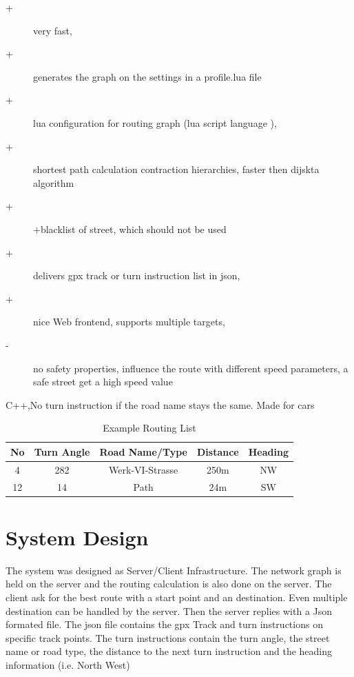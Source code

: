 \documentclass{sig-alternate}
\begin{document}
\begin{description}
\item[+]very fast, 
\item[+]generates the graph on the settings in a profile.lua file
\item[+]lua configuration for routing graph (lua script language ), 
\item[+]shortest path calculation contraction hierarchies, faster then dijskta algorithm
\item[+]+blacklist of street, which should not be used
\item[+]delivers gpx track or turn instruction list in json,
\item[+]nice Web frontend, supports multiple targets,
\item[-] no safety properties, influence the route with different speed parameters, a safe street get a high speed value
\end{description}

C++,No turn instruction if the road name stays the same. Made for cars


\begin{table}
\centering
\caption{Example Routing List}
\begin{tabular}{|c|c|c|c|c|} \hline
No&Turn Angle&Road Name/Type&Distance&Heading\\ \hline
4&282&Werk-VI-Strasse&250m&NW\\ \hline
12&14&Path&24m&SW\\ \hline
\end{tabular}
\end{table}



\section{System Design}
The system was designed as Server/Client Infrastructure. The network graph is held on the server and the routing calculation is also done on the server.  The client ask for the best route with a start point and an destination. Even multiple destination can be handled by the server. Then the server replies with a Json formated file. The json file contains the gpx Track and turn instructions on specific track points. The turn instructions contain the turn angle, the street name or road type, the distance to the next turn instruction and the heading information (i.e. North West) 
\end{document}
